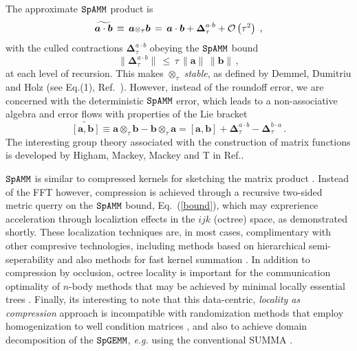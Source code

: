 \documentclass[letterpaper,twocolumn,amsmath,amsfont,amssymb,english,aps,jcp,preprintnumbers,groupaddress,nofootinbib,tightenlines]{revtex4}
\newcommand{\mat}[1]{\boldsymbol{#1}}
\newcommand{\ot}{ {\scriptstyle \otimes}_{ \tau } }
\begin{document}
The approximate $\tt SpAMM$ product is 
\begin{equation}
\widetilde{\mat{a}\cdot \mat{b}} \,  \equiv \, \mat{a} \ot \mat{b} \, 
  = \, \mat{a} \cdot \mat{b} + \mat{\Delta}^{a \cdot b}_{\tau} 
+ {\cal{O}} \left(  \tau^2 \right) \; ,
\end{equation}
with the culled contractions $\mat{\Delta}^{a \cdot b}_{\tau}$ obeying the $\tt SpAMM$ bound 
\begin{equation}\label{bound}
\lVert \mat{\Delta}^{a \cdot b}_{\tau} \rVert \, \leq \, \tau \, \lVert \mat{a} \rVert  \,  \lVert \mat{b} \rVert \, , 
\end{equation}
at each level of recursion.  This makes $\ot$ {\em stable}, as defined by Demmel, Dumitriu and Holz (see Eq.(1), Ref.~\cite{Demmel07}). 
However, instead of the roundoff error, we are concerned with the deterministic $\tt SpAMM$ error,  which 
leads to a non-associative algebra and error flows with properties of the Lie bracket
\begin{equation}
\widetilde{\left[ \mat{a} , \mat{b} \right]} \equiv \mat{a} \ot \mat{b}-\mat{b} \ot \mat{a}  
=  \left[ \mat{a} , \mat{b} \right]
+ \mat{\Delta}^{a\cdot b}_{\tau} -\mat{\Delta}^{b\cdot a}_{\tau} \,.
\end{equation}
The interesting group theory associated with the construction of matrix functions is developed by Higham, Mackey, Mackey and T 
in Ref.\cite{}.  

$\tt SpAMM$ is similar to compressed kernels for sketching the matrix product \cite{Kutzkov2012, Pagh2013}.  Instead of
the FFT however, compression is achieved through a recursive two-sided metric querry on the $\tt SpAMM$ bound, Eq.~(\ref{bound}),
which may exprerience acceleration through localiztion effects in the $ijk$ (octree) space, as demonstrated shortly. 
These localization techniques are, in most cases, complimentary with other compresive technologies, including methods based on 
hierarchical semi-seperability and also methods for fast kernel summation \cite{}. 
In addition to compression by occlusion, octree locality is important for the communication optimality of 
$n$-body methods \cite{Warren Salmon, Yellik} that may be achieved by minimal locally essential trees \cite{}.    
Finally, its interesting to note that this data-centric, {\em locality as compression} approach is incompatible with 
randomization methods that employ homogenization to well condition matrices 
\cite{pan, DiahLi and Parket Scott},  and also to achieve domain decomposition of the $\tt SpGEMM$, {\em e.g.} 
using the conventional SUMMA \cite{}.
\end{document}
